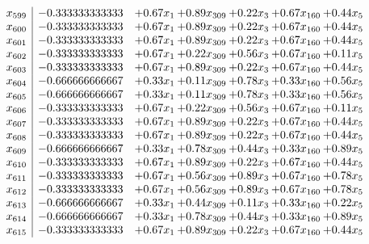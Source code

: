 \documentclass[8pt]{article}
\begin{document}
\[\begin{array}{c| c c@{\hskip 2pt} c@{\hskip 2pt} c@{\hskip 2pt} c@{\hskip 2pt} c@{\hskip 2pt} }
 x_{599}   &  -0.333333333333 & +  0.67 x_{1} & +  0.89 x_{309} & +  0.22 x_{3} & +  0.67 x_{160} & +  0.44 x_{5}\\
 x_{600}   &  -0.333333333333 & +  0.67 x_{1} & +  0.89 x_{309} & +  0.22 x_{3} & +  0.67 x_{160} & +  0.44 x_{5}\\
 x_{601}   &  -0.333333333333 & +  0.67 x_{1} & +  0.89 x_{309} & +  0.22 x_{3} & +  0.67 x_{160} & +  0.44 x_{5}\\
 x_{602}   &  -0.333333333333 & +  0.67 x_{1} & +  0.22 x_{309} & +  0.56 x_{3} & +  0.67 x_{160} & +  0.11 x_{5}\\
 x_{603}   &  -0.333333333333 & +  0.67 x_{1} & +  0.89 x_{309} & +  0.22 x_{3} & +  0.67 x_{160} & +  0.44 x_{5}\\
 x_{604}   &  -0.666666666667 & +  0.33 x_{1} & +  0.11 x_{309} & +  0.78 x_{3} & +  0.33 x_{160} & +  0.56 x_{5}\\
 x_{605}   &  -0.666666666667 & +  0.33 x_{1} & +  0.11 x_{309} & +  0.78 x_{3} & +  0.33 x_{160} & +  0.56 x_{5}\\
 x_{606}   &  -0.333333333333 & +  0.67 x_{1} & +  0.22 x_{309} & +  0.56 x_{3} & +  0.67 x_{160} & +  0.11 x_{5}\\
 x_{607}   &  -0.333333333333 & +  0.67 x_{1} & +  0.89 x_{309} & +  0.22 x_{3} & +  0.67 x_{160} & +  0.44 x_{5}\\
 x_{608}   &  -0.333333333333 & +  0.67 x_{1} & +  0.89 x_{309} & +  0.22 x_{3} & +  0.67 x_{160} & +  0.44 x_{5}\\
 x_{609}   &  -0.666666666667 & +  0.33 x_{1} & +  0.78 x_{309} & +  0.44 x_{3} & +  0.33 x_{160} & +  0.89 x_{5}\\
 x_{610}   &  -0.333333333333 & +  0.67 x_{1} & +  0.89 x_{309} & +  0.22 x_{3} & +  0.67 x_{160} & +  0.44 x_{5}\\
 x_{611}   &  -0.333333333333 & +  0.67 x_{1} & +  0.56 x_{309} & +  0.89 x_{3} & +  0.67 x_{160} & +  0.78 x_{5}\\
 x_{612}   &  -0.333333333333 & +  0.67 x_{1} & +  0.56 x_{309} & +  0.89 x_{3} & +  0.67 x_{160} & +  0.78 x_{5}\\
 x_{613}   &  -0.666666666667 & +  0.33 x_{1} & +  0.44 x_{309} & +  0.11 x_{3} & +  0.33 x_{160} & +  0.22 x_{5}\\
 x_{614}   &  -0.666666666667 & +  0.33 x_{1} & +  0.78 x_{309} & +  0.44 x_{3} & +  0.33 x_{160} & +  0.89 x_{5}\\
 x_{615}   &  -0.333333333333 & +  0.67 x_{1} & +  0.89 x_{309} & +  0.22 x_{3} & +  0.67 x_{160} & +  0.44 x_{5}\\

\end{array}\]
\end{document}
